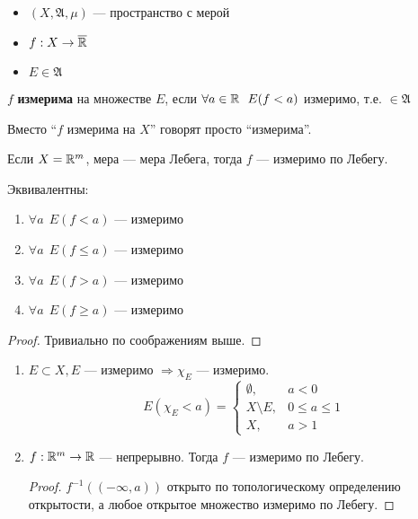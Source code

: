 \begin{definition}\itemfix
    \begin{itemize}
        \item \((X, \mathfrak{A}, \mu)\) --- пространство с мерой
        \item \(f : X \to \overline {\mathbb{R}}\)
        \item \(E\in \mathfrak{A}\)
    \end{itemize}

    \(f\) \textbf{измерима} на множестве \(E\), если \(\forall a\in\mathbb{R} \ \ E(f < a)\) измеримо, т.е. \(\in \mathfrak{A}\)
\end{definition}

Вместо ``\(f\) измерима на \(X\)'' говорят просто ``измерима''.

Если \(X = \mathbb{R}^m\), мера --- мера Лебега, тогда \(f\) --- измеримо по Лебегу.

\begin{remark}
    Эквивалентны:
    \begin{enumerate}
        \item \(\forall a \ \ E(f < a)\) --- измеримо
        \item \(\forall a \ \ E(f \leq a)\) --- измеримо
        \item \(\forall a \ \ E(f > a)\) --- измеримо
        \item \(\forall a \ \ E(f \geq a)\) --- измеримо
    \end{enumerate}
\end{remark}

\begin{proof}
    Тривиально по соображениям выше.
\end{proof}

\begin{example}\itemfix
    \begin{enumerate}
        \item \(E\subset X, E\) --- измеримо \( \Rightarrow \chi_E\) --- измеримо.
              \[E(\chi_E < a) = \begin{cases}
                      \emptyset,     & a < 0           \\
                      X \setminus E, & 0 \leq a \leq 1 \\
                      X ,            & a > 1
                  \end{cases}\]
        \item \(f:\mathbb{R}^m \to \mathbb{R}\) --- непрерывно. Тогда \(f\) --- измеримо по Лебегу.
              \begin{proof}
                  \(f^{ - 1}(( -\infty, a))\) открыто по топологическому определению открытости, а любое открытое множество измеримо по Лебегу.
              \end{proof}
    \end{enumerate}
\end{example}

